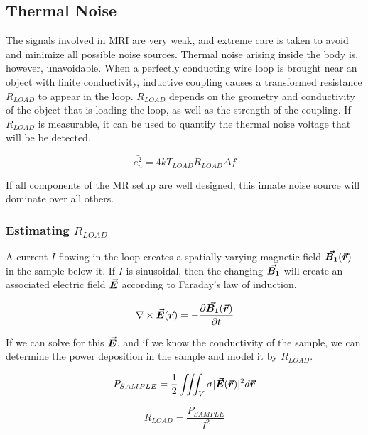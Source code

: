 \subsection{Thermal Noise}
The signals involved in MRI are very weak, and extreme care is taken to avoid and minimize all possible noise
sources. Thermal noise arising inside the body is, however, unavoidable. When a perfectly conducting wire loop is
brought near an object with finite conductivity, inductive coupling causes a transformed resistance $R_{LOAD}$ to appear
in the loop. $R_{LOAD}$ depends on the geometry and conductivity of the object that is loading the loop, as well as the
strength of the coupling. If $R_{LOAD}$ is measurable, it can be used to quantify the thermal noise voltage that will be be
detected.

\begin{equation}\label{eq:thermal_noise}
    \bar{e_n^2} = 4 k T_{LOAD} R_{LOAD} \Delta f
\end{equation}

If all components of the MR setup are well designed, this innate noise source will dominate over all others.

\subsubsection{Estimating $R_{LOAD}$}

A current $I$ flowing in the loop creates a spatially varying magnetic field $\bm{\vec{B_1}}(\bm{\vec{r}})$ in the sample below it. If $I$
is sinusoidal, then the changing $\bm{\vec{B_1}}$ will create an associated electric field $\bm{\vec{E}}$ according to Faraday's
law of induction.

\begin{equation}\label{eq:differential_faraday}
    \nabla \times \bm{\vec{E}}(\bm{\vec{r}}) = - \frac{\partial \bm{\vec{B_1}}(\bm{\vec{r}})}{\partial t}
\end{equation}

If we can solve for this $\bm{\vec{E}}$, and if we know the conductivity of the sample, we can determine the power
deposition in the sample and model it by $R_{LOAD}$.

\begin{equation}\label{eq:P_sample}
    P_{SAMPLE} = \frac{1}{2} \iiint_V \sigma |\bm{\vec{E}}(\bm{\vec{r}})|^2 d\bm{\vec{r}}
\end{equation} 

\begin{equation}
    R_{LOAD} = \frac{P_{SAMPLE}}{I^2} 
\end{equation}

